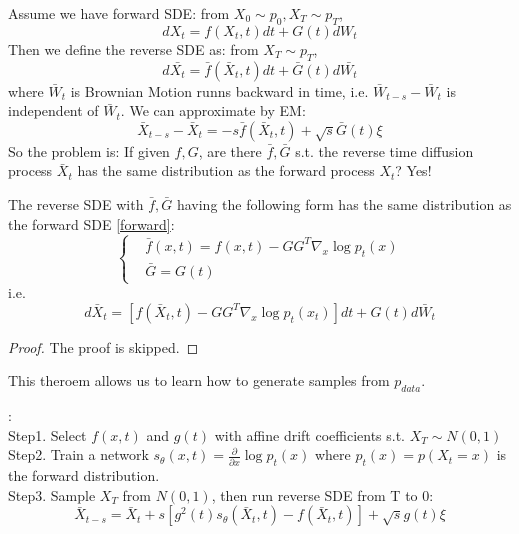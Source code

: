 Assume we have forward SDE: from $X_0\sim p_0,X_T\sim p_T$,
\begin{equation}\label{forward}
    dX_t = f(X_t, t)dt + G(t)dW_t
\end{equation}
Then we define the reverse SDE as: from $X_T\sim p_T$,
\begin{equation}
    d\bar{X_t}=\bar{f}(\bar{X}_t, t)dt + \bar{G}(t)d\bar{W_t}
\end{equation}
where $\bar{W}_t$ is Brownian Motion runns backward in time, i.e. $\bar{W}_{t-s}-\bar{W}_t$ is independent of $\bar{W}_t$. We can approximate by EM:
\begin{equation}
    \bar{X}_{t-s}-\bar{X}_t=-s\bar{f}(\bar{X}_t, t) + \sqrt{s}\bar{G}(t)\xi
\end{equation}
So the problem is: If given $f,G$, are there $\bar{f},\bar{G}$ s.t. the reverse time diffusion process $\bar{X}_t$ has the same distribution as the forward process $X_t$? Yes!
\begin{theorem}
    The reverse SDE with $\bar{f},\bar{G}$ having the following form has the same distribution as the forward SDE \ref{forward}:
    \begin{equation}\left\{
        \begin{aligned}
            &\bar{f}(x,t)=f(x,t)-GG^T\nabla_x\log p_t(x)\\
            &\bar{G}=G(t)
        \end{aligned}\right.
    \end{equation}
    i.e. 
    \begin{equation}
        d\bar{X}_t = \left[f(\bar{X}_t, t)-GG^T\nabla_x\log p_t(x_t)\right]dt+G(t)d\bar{W}_t
    \end{equation}
\end{theorem}
\begin{proof}
    The proof is skipped.
\end{proof}
This theroem allows us to learn how to generate samples from $p_{data}$.
\begin{algorithm}:\\
Step1. Select $f(x, t)$ and $g(t)$ with affine drift coefficients s.t. $X_T\sim N(0, 1)$\\
Step2. Train a network $s_\theta(x, t)=\frac{\partial}{\partial x}\log p_t(x)$ where $p_t(x)=p(X_t=x)$ is the forward distribution.\\
Step3. Sample $X_T$ from $N(0, 1)$, then run reverse SDE from T to 0:
\begin{equation}
    \bar{X}_{t-s} = \bar{X}_t + s\left[g^2(t)s_\theta(\bar{X}_t, t)-f(\bar{X}_t, t)\right] + \sqrt{s}g(t)\xi
\end{equation}
\end{algorithm}
